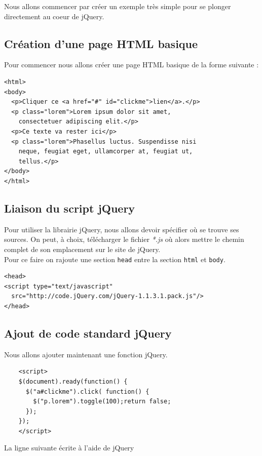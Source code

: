 \documentclass[10pt,a4paper,titlepage]{article}
\begin{document}
Nous allons commencer par créer un exemple très simple pour se plonger directement  au coeur de jQuery.

\subsection{Création d'une page HTML basique}

Pour commencer nous allons créer une page HTML basique de la forme suivante :

\begin{lstlisting}
<html>
<body>
  <p>Cliquer ce <a href="#" id="clickme">lien</a>.</p>
  <p class="lorem">Lorem ipsum dolor sit amet,
    consectetuer adipiscing elit.</p>
  <p>Ce texte va rester ici</p>
  <p class="lorem">Phasellus luctus. Suspendisse nisi
  	neque, feugiat eget, ullamcorper at, feugiat ut,
  	tellus.</p>
</body>
</html>
\end{lstlisting}

\subsection{Liaison du script jQuery}

Pour utiliser la librairie jQuery, nous allons devoir spécifier où se trouve ses sources. On peut, à choix, télécharger le fichier \emph{*.js} où alors mettre le chemin complet de son emplacement sur le site de jQuery. \\

Pour ce faire on rajoute une section \texttt{head} entre la section \texttt{html} et \texttt{body}.

\begin{lstlisting}
<head>
<script type="text/javascript"
  src="http://code.jQuery.com/jQuery-1.1.3.1.pack.js"/>
</head>
\end{lstlisting}

\subsection{Ajout de code standard jQuery}

Nous allons ajouter maintenant une fonction jQuery.

\begin{lstlisting}
	<script>
	$(document).ready(function() {
	  $("a#clickme").click( function() {
	    $("p.lorem").toggle(100);return false;
	  });
	});
	</script>
\end{lstlisting}

La ligne suivante écrite à l'aide de jQuery
\end{document}
